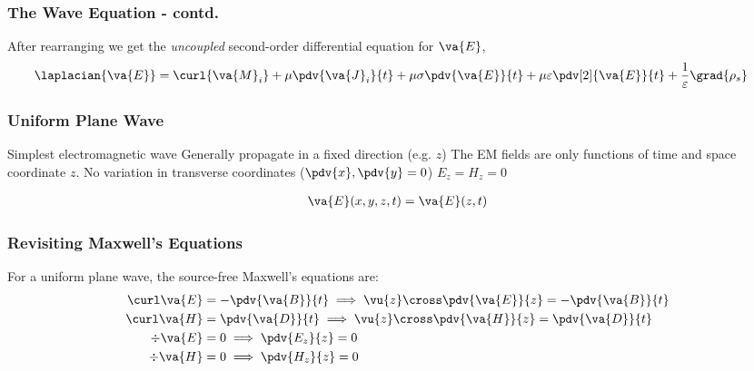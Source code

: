 \documentclass[10pt, compress]{beamer}
\newcommand{\E}{\varepsilon}  %
\renewcommand{\u}{\mu}  %
\newcommand{\p}{\rho}  %
\begin{document}
\begin{frame}
  \frametitle{The Wave Equation - contd.}
  After rearranging we get the \textit{uncoupled} second-order differential equation for $\va{E}$,
  \begin{align*}
  \laplacian {\va{E}} &= \curl {\va{M}_i} + \u  \pdv{\va{J}_i}{t} + \u \sigma \pdv{\va{E}}{t} + \u \E \pdv[2]{\va{E}}{t} + \frac{1}{\E} \grad{\p_s}
  \end{align*}

\end{frame}



\begin{frame}[fragile]
  \frametitle{Uniform Plane Wave}
      \begin{outline}
        \1 Simplest electromagnetic wave
        \1 Generally propagate in a fixed direction (e.g. $z$)
        \1 The EM fields are only functions of time and space coordinate $z$.
        \1 No variation in transverse coordinates ($\pdv{x}, \pdv{y} = 0$)
        \2 $E_z = H_z = 0$
        \end{outline}
        \begin{align*}
          \va{E}(x,y,z,t) = \va{E}(z,t)
        \end{align*}
\end{frame}
\begin{frame}[fragile]
  \frametitle{Revisiting Maxwell's Equations}
  For a uniform plane wave, the source-free Maxwell's equations are:
  \begin{align*}
\curl \va{E} &= - \pdv{\va{B}}{t} \implies \vu{z} \cross \pdv{\va{E}}{z} = - \pdv{\va{B}}{t} \\
\curl \va{H} &= \pdv{\va{D}}{t}  \implies \vu{z} \cross \pdv{\va{H}}{z} =  \pdv{\va{D}}{t} \\
\div \va{E} &= 0  \implies \pdv{{E_z}}{z} = 0\\
\div \va{H} &= 0 \implies \pdv{{H_z}}{z} = 0
\end{align*}
  \end{frame}
\end{document}
